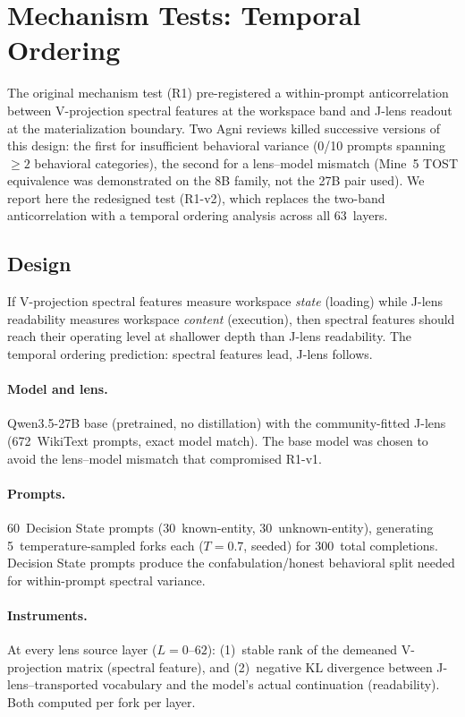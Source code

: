\documentclass[11pt,a4paper]{article}
\begin{document}
\section{Mechanism Tests: Temporal Ordering}
\label{sec:mechanism}

The original mechanism test (R1) pre-registered a within-prompt
anticorrelation between V-projection spectral features at the workspace
band and J-lens readout at the materialization boundary. Two Agni
reviews killed successive versions of this design: the first for
insufficient behavioral variance (0/10 prompts spanning ${\geq}2$
behavioral categories), the second for a lens--model mismatch (Mine~5
TOST equivalence was demonstrated on the 8B family, not the 27B pair
used). We report here the redesigned test (R1-v2), which replaces the
two-band anticorrelation with a temporal ordering analysis across all
63~layers.

\subsection{Design}

If V-projection spectral features measure workspace \emph{state}
(loading) while J-lens readability measures workspace \emph{content}
(execution), then spectral features should reach their operating level
at shallower depth than J-lens readability. The temporal ordering
prediction: spectral features lead, J-lens follows.

\paragraph{Model and lens.} Qwen3.5-27B base (pretrained, no
distillation) with the community-fitted J-lens (672~WikiText prompts,
exact model match). The base model was chosen to avoid the lens--model
mismatch that compromised R1-v1.

\paragraph{Prompts.} 60~Decision State prompts (30~known-entity,
30~unknown-entity), generating 5~temperature-sampled forks each
($T{=}0.7$, seeded) for 300~total completions. Decision State prompts
produce the confabulation/honest behavioral split needed for
within-prompt spectral variance.

\paragraph{Instruments.} At every lens source layer ($L{=}0$--$62$):
(1)~stable rank of the demeaned V-projection matrix (spectral feature),
and (2)~negative KL divergence between J-lens--transported vocabulary
and the model's actual continuation (readability). Both computed per
fork per layer.
\end{document}
